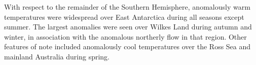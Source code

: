 With respect to the remainder of the Southern Hemisphere, anomalously warm temperatures were widespread over East Antarctica during all seasons except summer. The largest anomalies were seen over Wilkes Land during autumn and winter, in association with the anomalous northerly flow in that region. Other features of note included anomalously cool temperatures over the Ross Sea and mainland Australia during spring.
